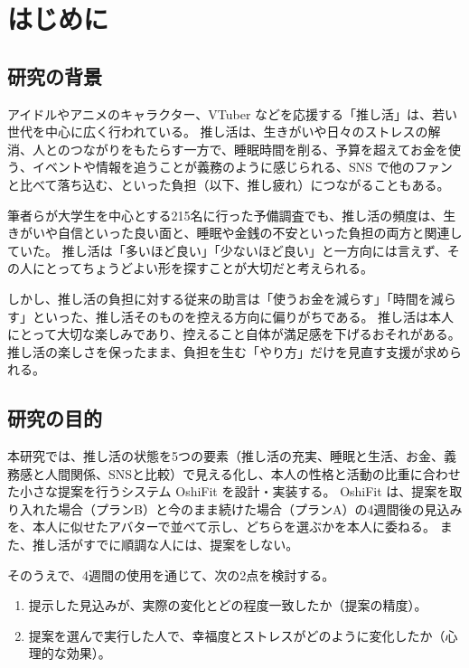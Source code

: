 \chapter{はじめに}

\section{研究の背景}
アイドルやアニメのキャラクター、VTuber などを応援する「推し活」は、若い世代を中心に広く行われている。
推し活は、生きがいや日々のストレスの解消、人とのつながりをもたらす一方で、睡眠時間を削る、予算を超えてお金を使う、イベントや情報を追うことが義務のように感じられる、SNS で他のファンと比べて落ち込む、といった負担（以下、推し疲れ）につながることもある。

筆者らが大学生を中心とする215名に行った予備調査でも、推し活の頻度は、生きがいや自信といった良い面と、睡眠や金銭の不安といった負担の両方と関連していた。
推し活は「多いほど良い」「少ないほど良い」と一方向には言えず、その人にとってちょうどよい形を探すことが大切だと考えられる。

しかし、推し活の負担に対する従来の助言は「使うお金を減らす」「時間を減らす」といった、推し活そのものを控える方向に偏りがちである。
推し活は本人にとって大切な楽しみであり、控えること自体が満足感を下げるおそれがある。
推し活の楽しさを保ったまま、負担を生む「やり方」だけを見直す支援が求められる。

\section{研究の目的}
本研究では、推し活の状態を5つの要素（推し活の充実、睡眠と生活、お金、義務感と人間関係、SNSと比較）で見える化し、本人の性格と活動の比重に合わせた小さな提案を行うシステム OshiFit を設計・実装する。
OshiFit は、提案を取り入れた場合（プランB）と今のまま続けた場合（プランA）の4週間後の見込みを、本人に似せたアバターで並べて示し、どちらを選ぶかを本人に委ねる。
また、推し活がすでに順調な人には、提案をしない。

そのうえで、4週間の使用を通じて、次の2点を検討する。
\begin{enumerate}
  \item 提示した見込みが、実際の変化とどの程度一致したか（提案の精度）。
  \item 提案を選んで実行した人で、幸福度とストレスがどのように変化したか（心理的な効果）。
\end{enumerate}

